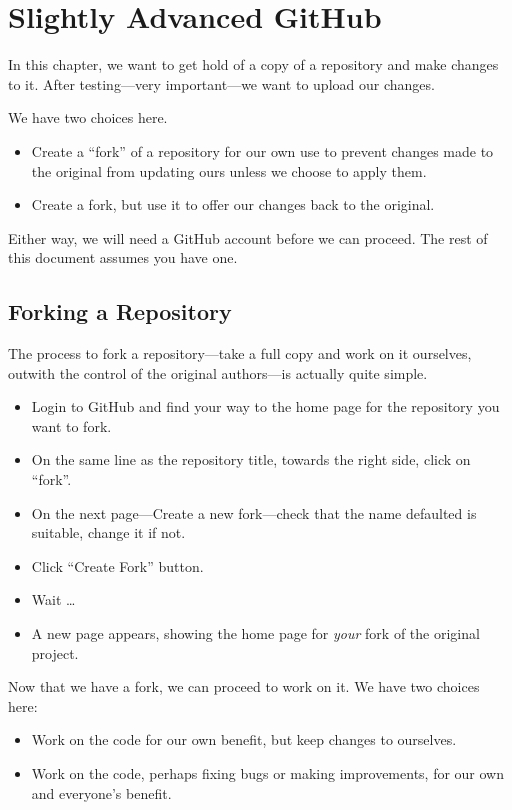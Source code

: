 \chapter{Slightly Advanced GitHub}\label{chap: Slightly Advanced Github}

In this chapter, we want to get hold of a copy of a repository and make changes to it. After testing---very important---we want to upload our changes.

We have two choices here.

\begin{itemize}
    \item Create a ``fork'' of a repository for our own use to prevent changes made to the original from updating ours unless we choose to apply them.
    \item Create a fork, but use it to offer our changes back to the original.
\end{itemize}

Either way, we will need a GitHub account before we can proceed. The rest of this document assumes you have one.

\section{Forking a Repository}\label{sect: Forking}

The process to fork a repository---take a full copy and work on it ourselves, outwith the control of the original authors---is actually quite simple.

\begin{itemize}
    \item Login to GitHub and find your way to the home page for the repository you want to fork.
    \item On the same line as the repository title, towards the right side, click on ``fork''.
    \item On the next page---Create a new fork---check that the name defaulted is suitable, change it if not.
    \item Click ``Create Fork'' button.
    \item Wait \ldots
    \item A new page appears, showing the home page for \emph{your} fork of the original project.
\end{itemize}

Now that we have a fork, we can proceed to work on it. We have two choices here:

\begin{itemize}
    \item Work on the code for our own benefit, but keep changes to ourselves.
    \item Work on the code, perhaps fixing bugs or making improvements, for our own and everyone's benefit.
\end{itemize}

